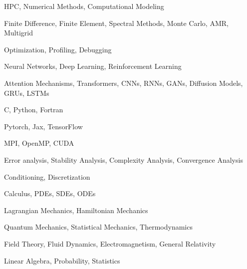 

\begin{cventries}

  {
    \begin{cvitems}
    \item HPC, Numerical Methods, Computational Modeling
    \item Finite Difference, Finite Element, Spectral Methods, Monte Carlo, AMR, Multigrid
    \item Optimization, Profiling, Debugging
    \end{cvitems}
  }

  {
    \begin{cvitems}
    \item Neural Networks, Deep Learning, Reinforcement Learning
    \item Attention Mechanisms, Transformers, CNNs, RNNs, GANs, Diffusion Models, GRUs, LSTMs
    \end{cvitems}
  }

  {
    \begin{cvitems}
    \item C, Python, Fortran 
    \item Pytorch, Jax, TensorFlow
    \item MPI, OpenMP, CUDA
    \end{cvitems}
  }

  {
    \begin{cvitems}
    \item Error analysis, Stability Analysis, Complexity Analysis, Convergence Analysis
    \item Conditioning, Discretization
    \end{cvitems}
  }

  {
    \begin{cvitems}
    \item Calculus, PDEs, SDEs, ODEs
    \item Lagrangian Mechanics, Hamiltonian Mechanics
    \item Quantum Mechanics, Statistical Mechanics, Thermodynamics
    \item Field Theory, Fluid Dynamics, Electromagnetism, General Relativity
    \item Linear Algebra, Probability, Statistics
    \end{cvitems}
  }


\end{cventries}
